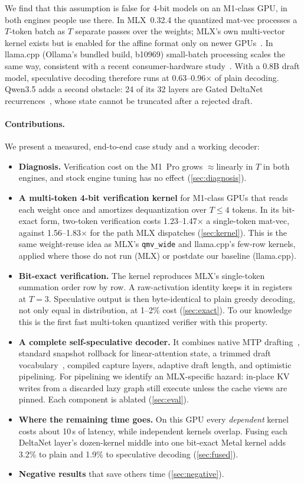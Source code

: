 \documentclass[11pt]{article}
\begin{document}
We find that this assumption is false for 4-bit models on an M1-class GPU, in both engines people use there. In MLX~0.32.4 the quantized mat-vec processes a $T$-token batch as $T$ separate passes over the weights; MLX's own multi-vector kernel exists but is enabled for the affine format only on newer GPUs~\cite{gross2026qmvwide}. In llama.cpp (Ollama's bundled build, b10969) small-batch processing scales the same way, consistent with a recent consumer-hardware study~\cite{chordiya2026lossless}. With a 0.8B draft model, speculative decoding therefore runs at 0.63--0.96$\times$ of plain decoding. Qwen3.5 adds a second obstacle: 24 of its 32 layers are Gated DeltaNet recurrences~\cite{yang2025gdn}, whose state cannot be truncated after a rejected draft.

\paragraph{Contributions.} We present a measured, end-to-end case study and a working decoder:
\begin{itemize}
\item \textbf{Diagnosis.} Verification cost on the M1~Pro grows $\approx$linearly in $T$ in both engines, and stock engine tuning has no effect (\cref{sec:diagnosis}).
\item \textbf{A multi-token 4-bit verification kernel} for M1-class GPUs that reads each weight once and amortizes dequantization over $T\le4$ tokens. In its bit-exact form, two-token verification costs 1.23--1.47$\times$ a single-token mat-vec, against 1.56--1.83$\times$ for the path MLX dispatches (\cref{sec:kernel}). This is the same weight-reuse idea as MLX's \texttt{qmv\_wide} and llama.cpp's few-row kernels, applied where those do not run (MLX) or postdate our baseline (llama.cpp).
\item \textbf{Bit-exact verification.} The kernel reproduces MLX's single-token summation order row by row. A raw-activation identity keeps it in registers at $T{=}3$. Speculative output is then byte-identical to plain greedy decoding, not only equal in distribution, at 1--2\% cost (\cref{sec:exact}). To our knowledge this is the first fast multi-token quantized verifier with this property.
\item \textbf{A complete self-speculative decoder.} It combines native MTP drafting~\cite{gloeckle2024mtp,deepseek2024v3}, standard snapshot rollback for linear-attention state, a trimmed draft vocabulary~\cite{zhao2025frspec}, compiled capture layers, adaptive draft length, and optimistic pipelining. For pipelining we identify an MLX-specific hazard: in-place KV writes from a discarded lazy graph still execute unless the cache views are pinned. Each component is ablated (\cref{sec:eval}).
\item \textbf{Where the remaining time goes.} On this GPU every \emph{dependent} kernel costs about 10\,\textmu s of latency, while independent kernels overlap. Fusing each DeltaNet layer's dozen-kernel middle into one bit-exact Metal kernel adds 3.2\% to plain and 1.9\% to speculative decoding (\cref{sec:fused}).
\item \textbf{Negative results} that save others time (\cref{sec:negative}).
\end{itemize}
\end{document}
